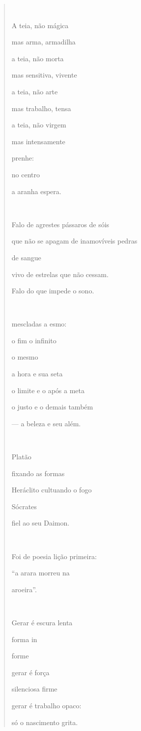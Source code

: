 \begin{quote}


A teia, não mágica

mas arma, armadilha

a teia, não morta

mas sensitiva, vivente

a teia, não arte

mas trabalho, tensa

a teia, não virgem

mas intensamente

prenhe:

no centro

a aranha espera.



Falo de agrestes pássaros de sóis

que não se apagam de inamovíveis pedras

de sangue

vivo de estrelas que não cessam.

Falo do que impede o sono.



mescladas a esmo:

o fim o infinito

o mesmo

a hora e sua seta

o limite e o após a meta

o justo e o demais também

--- a beleza e seu além.



Platão

fixando as formas

Heráclito cultuando o fogo

Sócrates

fiel ao seu Daimon.



Foi de poesia lição primeira:

``a arara morreu na

aroeira''.



Gerar é escura lenta

forma in

forme

gerar é força

silenciosa firme

gerar é trabalho opaco:

só o nascimento grita.
\end{quote}

